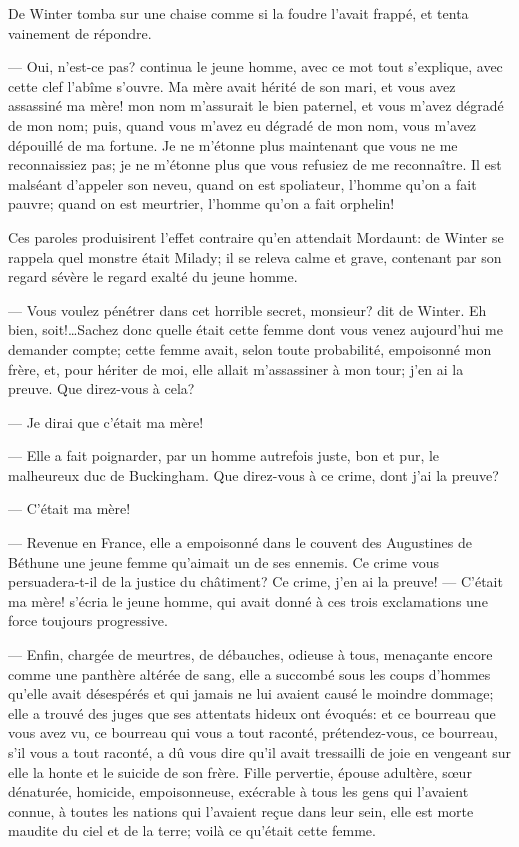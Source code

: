 De Winter tomba sur une chaise comme si la foudre l'avait frappé, et tenta vainement de répondre.

— Oui, n'est-ce pas? continua le jeune homme, avec ce mot tout s'explique, avec cette clef l'abîme s'ouvre. Ma mère avait hérité de son mari, et vous avez assassiné ma mère! mon nom m'assurait le bien paternel, et vous m'avez dégradé de mon nom; puis, quand vous m'avez eu dégradé de mon nom, vous m'avez dépouillé de ma fortune. Je ne m'étonne plus maintenant que vous ne me reconnaissiez pas; je ne m'étonne plus que vous refusiez de me reconnaître. Il est malséant d'appeler son neveu, quand on est spoliateur, l'homme qu'on a fait pauvre; quand on est meurtrier, l'homme qu'on a fait orphelin!

Ces paroles produisirent l'effet contraire qu'en attendait Mordaunt: de Winter se rappela quel monstre était Milady; il se releva calme et grave, contenant par son regard sévère le regard exalté du jeune homme.

— Vous voulez pénétrer dans cet horrible secret, monsieur? dit de Winter. Eh bien, soit!\dots Sachez donc quelle était cette femme dont vous venez aujourd'hui me demander compte; cette femme avait, selon toute probabilité, empoisonné mon frère, et, pour hériter de moi, elle allait m'assassiner à mon tour; j'en ai la preuve. Que direz-vous à cela?

— Je dirai que c'était ma mère!

— Elle a fait poignarder, par un homme autrefois juste, bon et pur, le malheureux duc de Buckingham. Que direz-vous à ce crime, dont j'ai la preuve?

— C'était ma mère!

— Revenue en France, elle a empoisonné dans le couvent des Augustines de Béthune une jeune femme qu'aimait un de ses ennemis.
Ce crime vous persuadera-t-il de la justice du châtiment? Ce crime, j'en ai la preuve!
— C'était ma mère! s'écria le jeune homme, qui avait donné à ces trois exclamations une force toujours progressive.

— Enfin, chargée de meurtres, de débauches, odieuse à tous, menaçante encore comme une panthère altérée de sang, elle a succombé sous les coups d'hommes qu'elle avait désespérés et qui jamais ne lui avaient causé le moindre dommage; elle a trouvé des juges que ses attentats hideux ont évoqués: et ce bourreau que vous avez vu, ce bourreau qui vous a tout raconté, prétendez-vous, ce bourreau, s'il vous a tout raconté, a dû vous dire qu'il avait tressailli de joie en vengeant sur elle la honte et le suicide de son frère. Fille pervertie, épouse adultère, sœur dénaturée, homicide, empoisonneuse, exécrable à tous les gens qui l'avaient connue, à toutes les nations qui l'avaient reçue dans leur sein, elle est morte maudite du ciel et de la terre; voilà ce qu'était cette femme.

